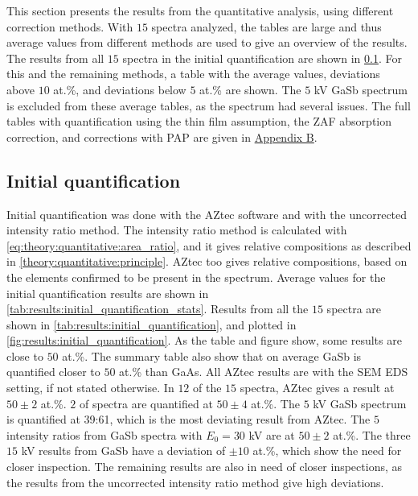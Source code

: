 This section presents the results from the quantitative analysis, using different correction methods.
With $15$ spectra analyzed, the tables are large and thus average values from different methods are used to give an overview of the results.
The results from all $15$ spectra in the initial quantification are shown in \cref{results:initial_quantification}.
For this and the remaining methods, a table with the average values, deviations above $10$ at.\%, and deviations below $5$ at.\% are shown.
The $5$ kV GaSb spectrum is excluded from these average tables, as the spectrum had several issues.
The full tables with quantification using the thin film assumption, the ZAF absorption correction, and corrections with PAP are given in \hyperref[appendix:tables]{Appendix B}.


\subsection{Initial quantification}
\label{results:initial_quantification}

Initial quantification was done with the AZtec software and with the uncorrected intensity ratio method.
The intensity ratio method is calculated with \cref{eq:theory:quantitative:area_ratio}, and it gives relative compositions as described in \cref{theory:quantitative:principle}.
AZtec too gives relative compositions, based on the elements confirmed to be present in the spectrum.
Average values for the initial quantification results are shown in \cref{tab:results:initial_quantification_stats}.
Results from all the $15$ spectra are shown in \cref{tab:results:initial_quantification}, and plotted in \cref{fig:results:initial_quantification}.
As the table and figure show, some results are close to $50$ at.\%.
The summary table also show that on average GaSb is quantified closer to $50$ at.\% than GaAs.
All AZtec results are with the SEM EDS setting, if not stated otherwise.
In $12$ of the $15$ spectra, AZtec gives a result at $50\pm2$ at.\%.
$2$ of spectra are quantified at $50\pm4$ at.\%.
The $5$ kV GaSb spectrum is quantified at 39:61, which is the most deviating result from AZtec.
The $5$ intensity ratios from GaSb spectra with $E_0 = 30$ kV are at $50\pm2$ at.\%.
The three $15$ kV results from GaSb have a deviation of $\pm10$ at.\%, which show the need for closer inspection.
The remaining results are also in need of closer inspections, as the results from the uncorrected intensity ratio method give high deviations.



